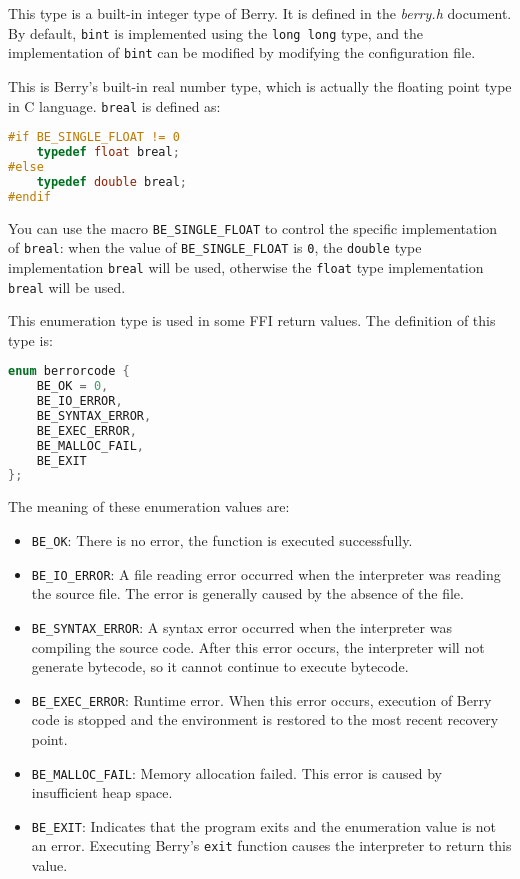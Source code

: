 
This type is a built-in integer type of Berry. It is defined in the \textsl{berry.h} document. By default, \texttt{bint} is implemented using the \texttt{long long} type, and the implementation of \texttt{bint} can be modified by modifying the configuration file.


This is Berry's built-in real number type, which is actually the floating point type in C language. \texttt{breal} is defined as:
\begin{lstlisting}[language=c, style=berry, numbers=none]
#if BE_SINGLE_FLOAT != 0
    typedef float breal;
#else
    typedef double breal;
#endif
\end{lstlisting}
You can use the macro \texttt{BE\_SINGLE\_FLOAT} to control the specific implementation of \texttt{breal}: when the value of \texttt{BE\_SINGLE\_FLOAT} is \texttt{0}, the \texttt{double} type implementation \texttt{breal} will be used, otherwise the \texttt{float} type implementation \texttt{breal} will be used.

 \label{section::errorcode}

This enumeration type is used in some FFI return values. The definition of this type is:
\begin{lstlisting}[language=c, style=berry, numbers=none]
enum berrorcode {
    BE_OK = 0,
    BE_IO_ERROR,
    BE_SYNTAX_ERROR,
    BE_EXEC_ERROR,
    BE_MALLOC_FAIL,
    BE_EXIT
};
\end{lstlisting}
The meaning of these enumeration values   are:
\begin{itemize}
    \item \texttt{BE\_OK}: There is no error, the function is executed successfully.
    \item \texttt{BE\_IO\_ERROR}: A file reading error occurred when the interpreter was reading the source file. The error is generally caused by the absence of the file.
    \item \texttt{BE\_SYNTAX\_ERROR}: A syntax error occurred when the interpreter was compiling the source code. After this error occurs, the interpreter will not generate bytecode, so it cannot continue to execute bytecode.
    \item \texttt{BE\_EXEC\_ERROR}: Runtime error. When this error occurs, execution of Berry code is stopped and the environment is restored to the most recent recovery point.
    \item \texttt{BE\_MALLOC\_FAIL}: Memory allocation failed. This error is caused by insufficient heap space.
    \item \texttt{BE\_EXIT}: Indicates that the program exits and the enumeration value is not an error. Executing Berry's \texttt{exit} function causes the interpreter to return this value.
\end{itemize}

